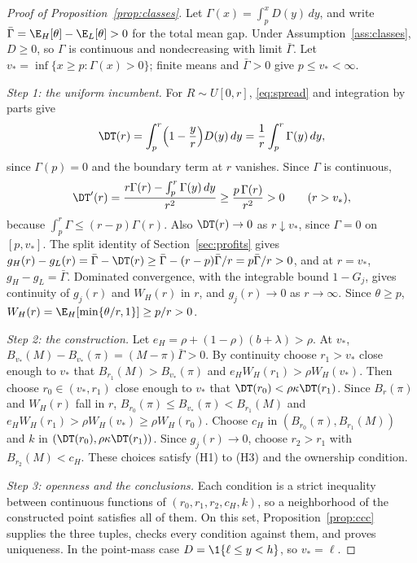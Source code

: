 \begin{proof}[Proof of Proposition~\ref{prop:classes}]
Let \(\Gamma(x)=\int_p^xD(y)\,dy\), and write \(\bar\Gamma=\E_H[\theta]-\E_L[\theta]>0\) for the total mean gap. Under
Assumption~\ref{ass:classes}, \(D\ge0\), so \(\Gamma\) is continuous and nondecreasing with limit \(\bar\Gamma\).
Let \(v_*=\inf\{x\ge p:\Gamma(x)>0\}\); finite means and \(\bar\Gamma>0\) give \(p\le v_*<\infty\).

\emph{Step 1: the uniform incumbent.} For \(R\sim U[0,r]\), \eqref{eq:spread} and integration by parts give
\[
\DT(r)=\int_p^r\Bigl(1-\frac yr\Bigr)D(y)\,dy=\frac1r\int_p^r\Gamma(y)\,dy ,
\]
since \(\Gamma(p)=0\) and the boundary term at \(r\) vanishes. Since \(\Gamma\) is continuous,
\[
\DT'(r)=\frac{r\Gamma(r)-\int_p^r\Gamma(y)\,dy}{r^2}\ge\frac{p\,\Gamma(r)}{r^2}>0\qquad(r>v_*),
\]
because \(\int_p^r\Gamma\le(r-p)\Gamma(r)\). Also \(\DT(r)\to0\) as \(r\downarrow v_*\), since \(\Gamma=0\) on
\([p,v_*]\). The split identity of Section~\ref{sec:profits} gives
\(g_H(r)-g_L(r)=\bar\Gamma-\DT(r)\ge\bar\Gamma-(r-p)\bar\Gamma/r=p\bar\Gamma/r>0\), and at \(r=v_*\), \(g_H-g_L=\bar\Gamma\). Dominated
convergence, with the integrable bound \(1-G_j\), gives continuity of \(g_j(r)\) and \(W_H(r)\) in \(r\), and
\(g_j(r)\to0\) as \(r\to\infty\). Since \(\theta\ge p\), \(W_H(r)=\E_H[\min\{\theta/r,1\}]\ge p/r>0\).

\emph{Step 2: the construction.} Let \(e_H=\rho+(1-\rho)(b+\lambda)>\rho\). At \(v_*\),
\(B_{v_*}(M)-B_{v_*}(\pi)=(M-\pi)\bar\Gamma>0\). By continuity choose \(r_1>v_*\) close enough to \(v_*\) that
\(B_{r_1}(M)>B_{v_*}(\pi)\) and \(e_HW_H(r_1)>\rho W_H(v_*)\). Then choose \(r_0\in(v_*,r_1)\) close enough to
\(v_*\) that \(\DT(r_0)<\rho\kappa\DT(r_1)\). Since \(B_r(\pi)\) and \(W_H(r)\) fall in \(r\),
\(B_{r_0}(\pi)\le B_{v_*}(\pi)<B_{r_1}(M)\) and \(e_HW_H(r_1)>\rho W_H(v_*)\ge\rho W_H(r_0)\). Choose \(c_H\) in
\((B_{r_0}(\pi),B_{r_1}(M))\) and \(k\) in \((\DT(r_0),\rho\kappa\DT(r_1))\). Since \(g_j(r)\to0\), choose
\(r_2>r_1\) with \(B_{r_2}(M)<c_H\). These choices satisfy (H1) to (H3) and the ownership condition.

\emph{Step 3: openness and the conclusions.} Each condition is a strict inequality between continuous functions of
\((r_0,r_1,r_2,c_H,k)\), so a neighborhood of the constructed point satisfies all of them. On this set,
Proposition~\ref{prop:ccc} supplies the three tuples, checks every condition against them, and proves uniqueness. In
the point-mass case \(D=\1\{\ell\le y<h\}\), so \(v_*=\ell\).
\end{proof}

